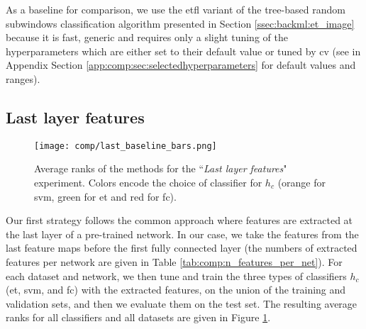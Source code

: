 As a baseline for comparison, we use the \acrshort{etfl} variant of the tree-based random subwindows classification algorithm presented in Section \ref{ssec:backml:et_image} because it is fast, generic and requires only a slight tuning of the hyperparameters which are either set to their default value or tuned by \acrlong{cv} (see in Appendix Section \ref{app:comp:sec:selectedhyperparameters} for default values and ranges).

\subsection{Last layer features}
\label{ssec:comp:exp_last_layer}

\begin{figure}
    \centering
    \texttt{[image: comp/last\_baseline\_bars.png]}
    \caption{Average ranks of the methods for the ``\textit{Last layer features}" experiment. Colors encode the choice of classifier for $h_c$ (orange for \acrshort{svm}, green for \acrshort{et} and red for \acrshort{fc}).}
    \label{fig:comp:avg_ranks_last_layer}
\end{figure}

Our first strategy follows the common approach where features are extracted at the last layer of a pre-trained network. In our case, we take the features from the last feature maps before the first fully connected layer (the numbers of extracted features per network are given in Table \ref{tab:comp:n_features_per_net}). For each dataset and network, we then tune and train the three types of classifiers $h_c$ (\acrshort{et}, \acrshort{svm}, and \acrshort{fc}) with the extracted features, on the union of the training and validation sets, and then we evaluate them on the test set. The resulting average ranks for all classifiers and all datasets are given in Figure \ref{fig:comp:avg_ranks_last_layer}.

